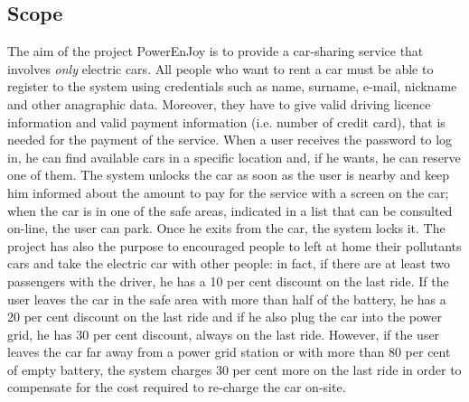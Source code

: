 \subsection{Scope} \label{subsec:scope}
The aim of the project %
PowerEnJoy is to provide a car-sharing service that involves \textit{only} electric cars. All people who want to %
rent a car must be able to register to the system using credentials such as name, surname, e-mail, nickname and other anagraphic data. Moreover, they have to give valid driving licence information and valid payment information (i.e. number of credit card), that is needed %
for the payment
of the service. 
When a user receives the password to log in, he can find available cars in a specific location and, if he wants, he can reserve %
one of them. The system unlocks the car as soon as the user is nearby and keep him informed about the amount to pay for the service with a screen on the car; when the car is in one of the safe areas, indicated in a list that can be consulted on-line, the user can park. Once he exits from the car, the system locks it. The project has also the purpose to encouraged people to left at home their pollutants cars and take the electric car with other people: in fact, if there are at least two passengers with the driver, he has a 10 per cent discount on the last ride. If the user leaves the car in the safe area with more than half of the battery, he has a 20 per cent discount on the last ride and if he also plug the car into the power grid, he has 30 per cent discount, always on the last ride. However, if the user leaves the car far away from a power grid station or with more than 80 per cent of empty battery, the system charges 30 per cent more on the last ride in order to compensate for the cost required to re-charge the car on-site.

